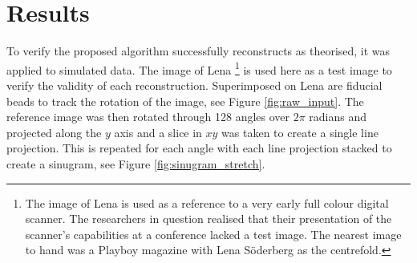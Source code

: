 \section{Results}

To verify the proposed algorithm successfully reconstructs as theorised, it was applied to simulated data.
The image of Lena
\footnote{The image of Lena is used as a reference to a very early full colour digital scanner.
The researchers in question realised that their presentation of the scanner's capabilities at a conference lacked a test image.
The nearest image to hand was a Playboy magazine with Lena Söderberg as the centrefold.}
is used here as a test image to verify the validity of each reconstruction.
Superimposed on Lena are fiducial beads to track the rotation of the image, see Figure \ref{fig:raw_input}.
The reference image was then rotated through 128 angles over $2\pi$ radians and projected along the $y$ axis and a slice in $xy$ was taken to create a single line projection.
This is repeated for each angle with each line projection stacked to create a sinugram, see Figure \ref{fig:sinugram_stretch}.

